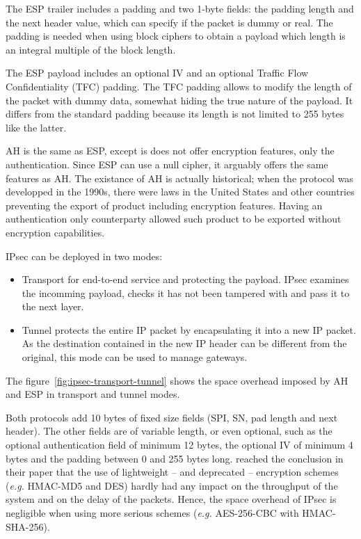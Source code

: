 \noindent The ESP trailer includes a padding and two 1-byte fields: the padding length and the next header value, which can specify if the packet is dummy or real.
The padding is needed when using block ciphers to obtain a payload which length is an integral multiple of the block length.

\noindent The ESP payload includes an optional IV and an optional Traffic Flow Confidentiality (TFC) padding.
The TFC padding allows to modify the length of the packet with dummy data, somewhat hiding the true nature of the payload.
It differs from the standard padding because its length is not limited to 255 bytes like the latter.

\noindent AH is the same as ESP, except is does not offer encryption features, only the authentication.
Since ESP can use a null cipher, it arguably offers the same features as AH.
The existance of AH is actually historical; when the protocol was developped in the 1990s, there were laws in the United States and other countries preventing the export of product including encryption features.
Having an authentication only counterparty allowed such product to be exported without encryption capabilities.\newline{}

IPsec can be deployed in two modes: 
\begin{itemize}
	\item Transport for end-to-end service and protecting the payload. IPsec examines the incomming payload, checks it has not been tampered with and pass it to the next layer.
	\item Tunnel protects the entire IP packet by encapsulating it into a new IP packet. As the destination contained in the new IP header can be different from the original, this mode can be used to manage gateways.
\end{itemize}
The figure~\ref{fig:ipsec-transport-tunnel} shows the space overhead imposed by AH and ESP in transport and tunnel modes.

Both protocols add 10 bytes of fixed size fields (SPI, SN, pad length and next header).
The other fields are of variable length, or even optional, such as the optional authentication field of minimum 12 bytes, the optional IV of minimum 4 bytes and the padding between 0 and 255 bytes long.
\citet{Xenakis20063225} reached the conclusion in their paper that the use of lightweight -- and deprecated -- encryption schemes (\textit{e.g.} HMAC-MD5 and DES) hardly had any impact on the throughput of the system and on the delay of the packets.
Hence, the space overhead of IPsec is negligible when using more serious schemes (\textit{e.g.} AES-256-CBC with HMAC-SHA-256).



